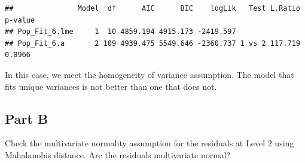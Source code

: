 \documentclass[]{article}
\newenvironment{Shaded}{\begin{snugshade}}{\end{snugshade}}
\newcommand{\KeywordTok}[1]{\textcolor[rgb]{0.13,0.29,0.53}{\textbf{#1}}}
\newcommand{\DataTypeTok}[1]{\textcolor[rgb]{0.13,0.29,0.53}{#1}}
\newcommand{\DecValTok}[1]{\textcolor[rgb]{0.00,0.00,0.81}{#1}}
\newcommand{\StringTok}[1]{\textcolor[rgb]{0.31,0.60,0.02}{#1}}
\newcommand{\OperatorTok}[1]{\textcolor[rgb]{0.81,0.36,0.00}{\textbf{#1}}}
\newcommand{\NormalTok}[1]{#1}
\begin{document}
\begin{verbatim}
##               Model  df      AIC      BIC    logLik   Test L.Ratio p-value
## Pop_Fit_6.lme     1  10 4859.194 4915.173 -2419.597                       
## Pop_Fit_6.a       2 109 4939.475 5549.646 -2360.737 1 vs 2 117.719  0.0966
\end{verbatim}

In this case, we meet the homogeneity of variance assumption. The model
that fits unique variances is not better than one that does not.

\subsection{Part B}\label{part-b-4}

Check the multivariate normality assumption for the residuals at Level 2
using Mahalanobis distance. Are the residuals multivariate normal?

\begin{Shaded}
\end{Shaded}
\end{document}
